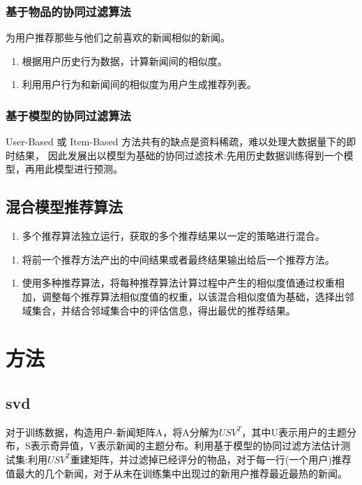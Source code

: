 \documentclass[UTF8]{article}
\begin{document}
\subsubsection{基于物品的协同过滤算法}
为用户推荐那些与他们之前喜欢的新闻相似的新闻。
	\begin{enumerate}{(1)}
	\item 根据用户历史行为数据，计算新闻间的相似度。
\end{enumerate}
\begin{enumerate}{(2)}
	\item 利用用户行为和新闻间的相似度为用户生成推荐列表。
\end{enumerate}
\subsubsection{基于模型的协同过滤算法}
User-Based 或 Item-Based 方法共有的缺点是资料稀疏，难以处理大数据量下的即时结果，
因此发展出以模型为基础的协同过滤技术:先用历史数据训练得到一个模型，再用此模型进行预测。
\subsection{混合模型推荐算法}
	\begin{enumerate}{(1)}
	\item 多个推荐算法独立运行，获取的多个推荐结果以一定的策略进行混合。
\end{enumerate}
	\begin{enumerate}{(2)}
	\item 将前一个推荐方法产出的中间结果或者最终结果输出给后一个推荐方法。
\end{enumerate}
	\begin{enumerate}{(3)}
	\item 使用多种推荐算法，将每种推荐算法计算过程中产生的相似度值通过权重相加，调整每个推荐算法相似度值的权重，以该混合相似度值为基础，选择出邻域集合，并结合邻域集合中的评估信息，得出最优的推荐结果。
\end{enumerate}

\section{方法}
\subsection{svd}
对于训练数据，构造用户-新闻矩阵A，将A分解为$USV^{T}$，其中U表示用户的主题分布，S表示奇异值，V表示新闻的主题分布。利用基于模型的协同过滤方法估计测试集:利用$USV^{T}$重建矩阵，并过滤掉已经评分的物品，对于每一行(一个用户)推荐值最大的几个新闻，对于从未在训练集中出现过的新用户推荐最近最热的新闻。
\end{document}

